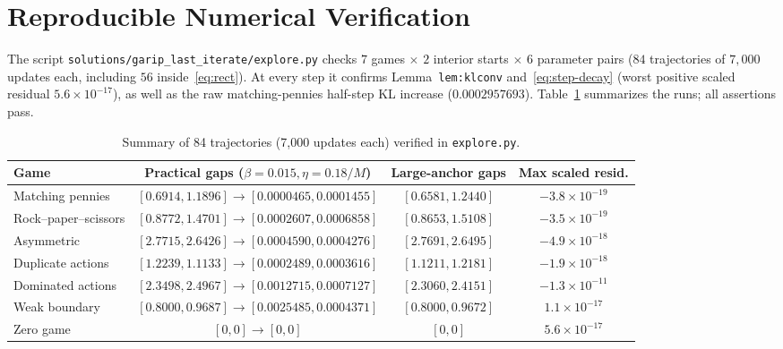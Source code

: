 \documentclass[11pt]{article}
\theoremstyle{plain}
\theoremstyle{definition}
\theoremstyle{remark}
\begin{document}
\section{Reproducible Numerical Verification}

The script \texttt{solutions/garip\_last\_iterate/explore.py} checks $7$ games $\times$ $2$ interior starts $\times$ $6$ parameter pairs ($84$ trajectories of $7{,}000$ updates each, including $56$ inside~\eqref{eq:rect}). At every step it confirms Lemma~\texttt{lem:klconv} and~\eqref{eq:step-decay} (worst positive scaled residual $5.6 \times 10^{-17}$), as well as the raw matching-pennies half-step KL increase ($0.0002957693$). Table~\ref{tab:garip} summarizes the runs; all assertions pass.

\begin{table}[htbp]
\centering
\small
\begin{tabular}{@{}lccc@{}}
\toprule
Game & Practical gaps ($\beta=0.015, \eta=0.18/M$) & Large-anchor gaps & Max scaled resid. \\
\midrule
Matching pennies & $[0.6914, 1.1896] \to [0.0000465, 0.0001455]$ & $[0.6581, 1.2440]$ & $-3.8 \times 10^{-19}$ \\
Rock--paper--scissors & $[0.8772, 1.4701] \to [0.0002607, 0.0006858]$ & $[0.8653, 1.5108]$ & $-3.5 \times 10^{-19}$ \\
Asymmetric & $[2.7715, 2.6426] \to [0.0004590, 0.0004276]$ & $[2.7691, 2.6495]$ & $-4.9 \times 10^{-18}$ \\
Duplicate actions & $[1.2239, 1.1133] \to [0.0002489, 0.0003616]$ & $[1.1211, 1.2181]$ & $-1.9 \times 10^{-18}$ \\
Dominated actions & $[2.3498, 2.4967] \to [0.0012715, 0.0007127]$ & $[2.3060, 2.4151]$ & $-1.3 \times 10^{-11}$ \\
Weak boundary & $[0.8000, 0.9687] \to [0.0025485, 0.0004371]$ & $[0.8000, 0.9672]$ & $1.1 \times 10^{-17}$ \\
Zero game & $[0, 0] \to [0, 0]$ & $[0, 0]$ & $5.6 \times 10^{-17}$ \\
\bottomrule
\end{tabular}
\caption{Summary of 84 trajectories (7,000 updates each) verified in \texttt{explore.py}.}\label{tab:garip}
\end{table}
\end{document}
